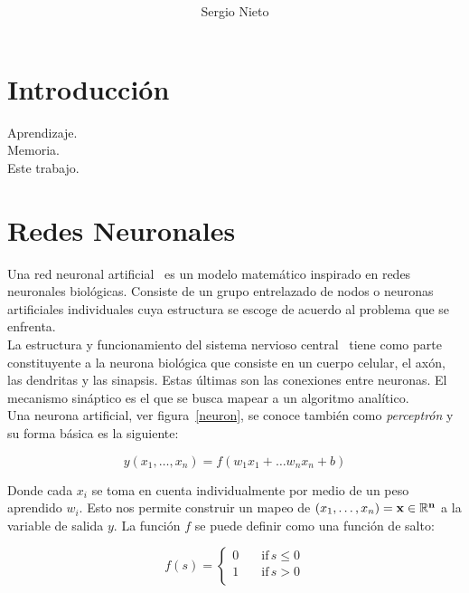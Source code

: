 \documentclass[letterpaper,12pt]{article}
\title{{\boldmath{ Memoria Densamente Asociada}}
           }
\author[1]{Sergio Nieto}
\affiliation{Facultad de Ciencias\note{Curso: Seminario de Matemáticas Aplicadas}, UNAM.}
\begin{document}
\maketitle
\flushbottom

\section{Introducción}
\label{sec:intro}


Aprendizaje.\\

\parindent=0cm Memoria.\\

Este trabajo. \\

\section{Redes Neuronales}
\label{sec:nn}

 Una red neuronal artificial~\cite{dl} es un modelo matemático inspirado en redes neuronales biológicas. Consiste de un grupo entrelazado de nodos o neuronas artificiales individuales cuya estructura se escoge de acuerdo al problema que se enfrenta. \\

La estructura y funcionamiento del sistema nervioso central~\cite{neuro} tiene como parte constituyente a la neurona biológica que consiste en un cuerpo celular, el axón, las dendritas y las sinapsis. Estas últimas son las conexiones entre neuronas. El mecanismo sináptico es el que se busca mapear a un algoritmo analítico.\\

Una neurona artificial, ver figura~\ref{neuron}, se conoce también como \emph{perceptrón} y su forma básica es la siguiente:

\begin{equation}
  y(x_1, \dots, x_n) = f(w_1 x_1 + \dots w_n x_n + b)
\end{equation}

Donde cada $x_i$ se toma en cuenta individualmente por medio de un peso aprendido $w_i$. Esto nos permite construir un mapeo de $(x_1, \dots, x_n) = \bf{x} \in \mathbb{R}^n$ a la variable de salida $y$. La función $f$ se puede definir como una función de salto:

\begin{equation*}
f(s)=\begin{cases}
          0 \quad &\text{if} \, s \leq 0 \\
          1 \quad &\text{if} \, s > 0 \\
     \end{cases}
\end{equation*}
\end{document}
